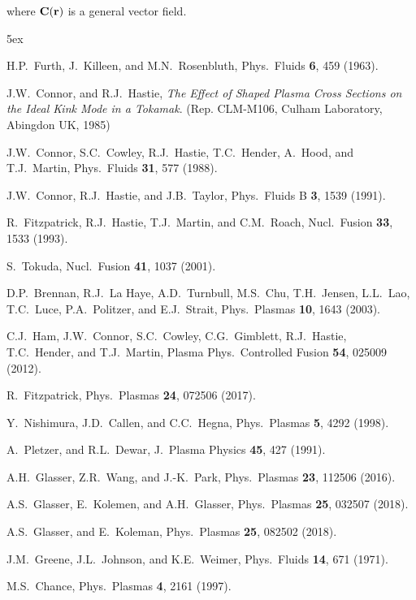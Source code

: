 \documentclass[12pt,prb,aps]{revtex4-1}
\begin{document}
where ${\bf C}({\bf r})$ is a general vector field.

\begin{thebibliography}{99}\baselineskip 5ex

 H.P.~Furth,  J.~Killeen, and M.N.~Rosenbluth,  Phys.\ Fluids {\bf 6}, 459 (1963).

 J.W.~Connor, and R.J.~Hastie, {\em The Effect of Shaped Plasma Cross Sections on the Ideal Kink Mode in a Tokamak}. (Rep. CLM-M106, Culham Laboratory, Abingdon UK, 1985)

 J.W.~Connor,  S.C.~Cowley, R.J.~Hastie,  T.C.~Hender,  A.~Hood, and T.J.~Martin, 
Phys.\ Fluids {\bf 31}, 577 (1988).

 J.W.~Connor, R.J.~Hastie, and J.B.~Taylor, Phys.\ Fluids B {\bf 3}, 1539 (1991).

 R.~Fitzpatrick, R.J.~Hastie, T.J.~Martin, and C.M.~Roach, Nucl.\ Fusion {\bf 33}, 1533 (1993).

 S.~Tokuda, Nucl.\ Fusion {\bf 41}, 1037 (2001).

 D.P.~Brennan, R.J.~La Haye, A.D.~Turnbull, M.S.~Chu, T.H.~Jensen, L.L.~Lao, T.C.~Luce, P.A.~Politzer, and E.J.~Strait, Phys.\ Plasmas {\bf 10}, 1643 (2003).

 C.J.~Ham, J.W.~Connor, S.C.~Cowley, C.G.~Gimblett, R.J.~Hastie, T.C.~Hender, and T.J.~Martin, Plasma Phys.\ Controlled Fusion {\bf 54}, 025009 (2012). 

 R.~Fitzpatrick, Phys.\ Plasmas {\bf 24}, 072506 (2017). 

 Y.~Nishimura, J.D.~Callen, and C.C.~Hegna, Phys.\ Plasmas {\bf 5}, 4292 (1998).

 A.~Pletzer, and R.L.~Dewar, J.\ Plasma Physics {\bf 45}, 427 (1991).

 A.H.~Glasser, Z.R.~Wang, and J.-K.~Park, Phys.\ Plasmas {\bf 23}, 112506 (2016).

 A.S.~Glasser, E.~Kolemen, and A.H.~Glasser, Phys.\ Plasmas {\bf 25}, 032507 (2018).

 A.S.~Glasser, and E.~Koleman, Phys.\ Plasmas {\bf 25}, 082502 (2018). 

 J.M.~Greene, J.L.~Johnson, and K.E.~Weimer,  Phys.\  Fluids  {\bf 14}, 671 (1971).

 M.S.~Chance, Phys.\ Plasmas {\bf 4}, 2161 (1997).


\end{thebibliography}
\end{document}
